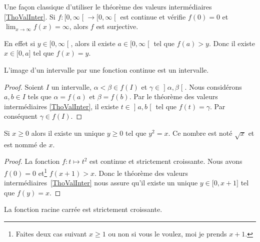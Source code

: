 \begin{normaltext}      \label{NORMooTQWWooQVPWIJ}
	Une façon classique d'utiliser le théorème des valeurs intermédiaires \ref{ThoValInter}. Si \( f\colon \mathopen[ 0 , \infty \mathclose[\to \mathopen[ 0 , \infty \mathclose[\) est continue et vérifie \( f(0)=0\) et \( \lim_{x\to \infty} f(x)=\infty\), alors \( f\) est surjective.

	En effet si \( y\in \mathopen[ 0 , \infty \mathclose[\), alors il existe \( a\in\mathopen[ 0 , \infty \mathclose[\) tel que \( f(a)>y\). Donc il existe \( x\in \mathopen[ 0 , a \mathclose]\) tel que \( f(x)=y\).
\end{normaltext}

\begin{corollary}       \label{CorImInterInter}
	L'image d'un intervalle par une fonction continue est un intervalle.
\end{corollary}

\begin{proof}
	Soient \( I\) un intervalle, \( \alpha<\beta\in f(I)\) et \( \gamma\in\mathopen] \alpha , \beta \mathclose[\). Nous considérons \(a,b\in I\) tels que \( \alpha=f(a)\) et \( \beta=f(b)\). Par le théorème des valeurs intermédiaires \ref{ThoValInter}, il existe \( t\in\mathopen] a , b \mathclose[\) tel que \( f(t)=\gamma\). Par conséquent \( \gamma\in f(I)\).
\end{proof}

\begin{corollaryDef}     \label{DEFooGQTYooORuvQb}
	Si \( x\geq 0\) alors il existe un unique \( y\geq 0\) tel que \( y^2=x\). Ce nombre est noté \( \sqrt{x}\) et est nommé  de \( x\).
\end{corollaryDef}

\begin{proof}
	La fonction \( f\colon t\mapsto t^2\) est continue et strictement croissante. Nous avons \( f(0)=0\) et\footnote{Faites deux cas suivant \( x\geq 1\) ou non si vous le voulez, moi je prends \( x+1\).} \( f(x+1)>x\). Donc le théorème des valeurs intermédiaires~\ref{ThoValInter} nous assure qu'il existe un unique \( y\in\mathopen[ 0 , x+1 \mathclose]\) tel que \( f(y)=x\).
\end{proof}

\begin{lemma}       \label{LEMooSBOAooOOIotR}
	La fonction racine carrée est strictement croissante.
\end{lemma}

